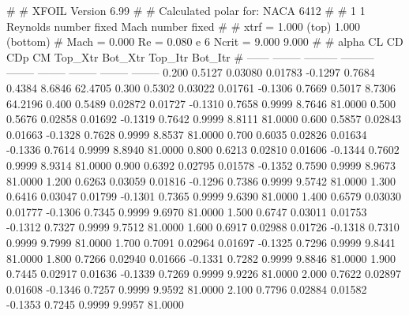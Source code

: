 #  
#       XFOIL         Version 6.99
#  
# Calculated polar for: NACA 6412                                       
#  
# 1 1 Reynolds number fixed          Mach number fixed         
#  
# xtrf =   1.000 (top)        1.000 (bottom)  
# Mach =   0.000     Re =     0.080 e 6     Ncrit =   9.000  9.000
#  
#   alpha    CL        CD       CDp       CM     Top_Xtr  Bot_Xtr  Top_Itr  Bot_Itr
#  ------ -------- --------- --------- -------- -------- -------- -------- --------
   0.200   0.5127   0.03080   0.01783  -0.1297   0.7684   0.4384   8.6846  62.4705
   0.300   0.5302   0.03022   0.01761  -0.1306   0.7669   0.5017   8.7306  64.2196
   0.400   0.5489   0.02872   0.01727  -0.1310   0.7658   0.9999   8.7646  81.0000
   0.500   0.5676   0.02858   0.01692  -0.1319   0.7642   0.9999   8.8111  81.0000
   0.600   0.5857   0.02843   0.01663  -0.1328   0.7628   0.9999   8.8537  81.0000
   0.700   0.6035   0.02826   0.01634  -0.1336   0.7614   0.9999   8.8940  81.0000
   0.800   0.6213   0.02810   0.01606  -0.1344   0.7602   0.9999   8.9314  81.0000
   0.900   0.6392   0.02795   0.01578  -0.1352   0.7590   0.9999   8.9673  81.0000
   1.200   0.6263   0.03059   0.01816  -0.1296   0.7386   0.9999   9.5742  81.0000
   1.300   0.6416   0.03047   0.01799  -0.1301   0.7365   0.9999   9.6390  81.0000
   1.400   0.6579   0.03030   0.01777  -0.1306   0.7345   0.9999   9.6970  81.0000
   1.500   0.6747   0.03011   0.01753  -0.1312   0.7327   0.9999   9.7512  81.0000
   1.600   0.6917   0.02988   0.01726  -0.1318   0.7310   0.9999   9.7999  81.0000
   1.700   0.7091   0.02964   0.01697  -0.1325   0.7296   0.9999   9.8441  81.0000
   1.800   0.7266   0.02940   0.01666  -0.1331   0.7282   0.9999   9.8846  81.0000
   1.900   0.7445   0.02917   0.01636  -0.1339   0.7269   0.9999   9.9226  81.0000
   2.000   0.7622   0.02897   0.01608  -0.1346   0.7257   0.9999   9.9592  81.0000
   2.100   0.7796   0.02884   0.01582  -0.1353   0.7245   0.9999   9.9957  81.0000
